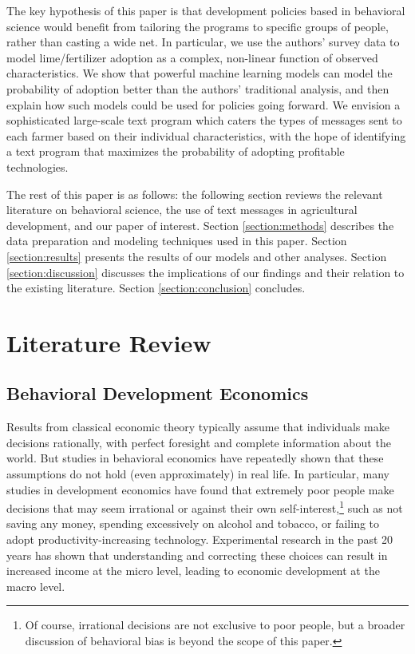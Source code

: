 \documentclass[12pt]{article}
\begin{document}
The key hypothesis of this paper is that development policies based in behavioral science would benefit from tailoring the programs to specific groups of people, rather than casting a wide net. In particular, we use the authors' survey data to model lime/fertilizer adoption as a complex, non-linear function of observed characteristics. We show that powerful machine learning models can model the probability of adoption better than the authors' traditional analysis, and then explain how such models could be used for policies going forward. We envision a sophisticated large-scale text program which caters the types of messages sent to each farmer based on their individual characteristics, with the hope of identifying a text program that maximizes the probability of adopting profitable technologies.

The rest of this paper is as follows: the following section reviews the relevant literature on behavioral science, the use of text messages in agricultural development, and our paper of interest. Section \ref{section:methods} describes the data preparation and modeling techniques used in this paper. Section \ref{section:results} presents the results of our models and other analyses. Section \ref{section:discussion} discusses the implications of our findings and their relation to the existing literature. Section \ref{section:conclusion} concludes.

\section{Literature Review}
\label{section:litreview}

\subsection{Behavioral Development Economics}
Results from classical economic theory typically assume that individuals make decisions rationally, with perfect foresight and complete information about the world. But studies in behavioral economics have repeatedly shown that these assumptions do not hold (even approximately) in real life. In particular, many studies in development economics have found that extremely poor people make decisions that may seem irrational or against their own self-interest,\footnote{Of course, irrational decisions are not exclusive to poor people, but a broader discussion of behavioral bias is beyond the scope of this paper.} such as not saving any money, spending excessively on alcohol and tobacco, or failing to adopt productivity-increasing technology. Experimental research in the past 20 years has shown that understanding and correcting these choices can result in increased income at the micro level, leading to economic development at the macro level.
\end{document}
